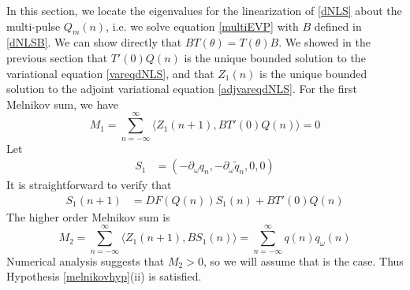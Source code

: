 \documentclass[12pt]{article}
\begin{document}
In this section, we locate the eigenvalues for the linearization of \eqref{dNLS} about the multi-pulse $Q_m(n)$, i.e. we solve equation \eqref{multiEVP} with $B$ defined in \eqref{dNLSB}. We can show directly that $B T(\theta) = T(\theta) B$. We showed in the previous section that $T'(0)Q(n)$ is the unique bounded solution to the variational equation \eqref{vareqdNLS}, and that $Z_1(n)$ is the unique bounded solution to the adjoint variational equation \eqref{adjvareqdNLS}. For the first Melnikov sum, we have
\[
M_1 = \sum_{n=-\infty}^\infty \langle Z_1(n+1), B T'(0)Q(n) \rangle = 0
\]
Let 
\begin{align}\label{dNLSdefS1}
S_1 &= (-\partial_\omega q_n, -\partial_\omega \tilde{q}_n, 0, 0)
\end{align}
It is straightforward to verify that
\begin{align*}
S_1(n+1) &= DF(Q(n)) S_1(n) + B T'(0) Q(n)
\end{align*}
The higher order Melnikov sum is
\[
M_2 = \sum_{n=-\infty}^\infty \langle Z_1(n+1), B S_1(n) \rangle =
\sum_{n=-\infty}^\infty q(n) q_\omega(n)
\]
Numerical analysis suggests that $M_2 > 0$, so we will assume that is the case. Thus Hypothesis \ref{melnikovhyp}(ii) is satisfied.
\end{document}
